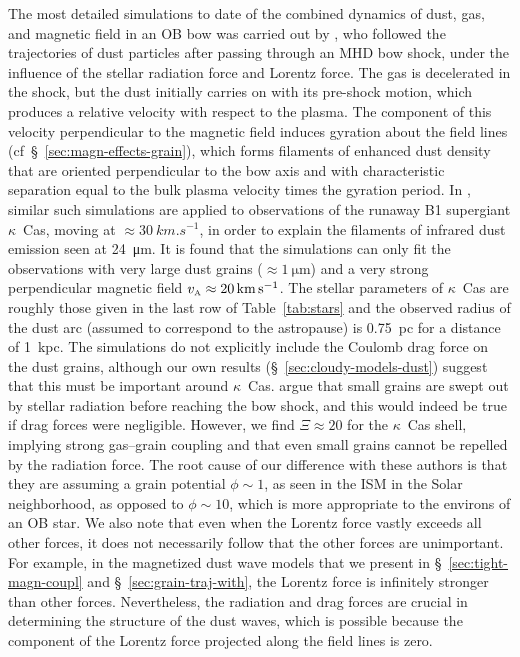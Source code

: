 The most detailed simulations to date of the combined dynamics of
dust, gas, and magnetic field in an OB bow was carried out by
\citet{Katushkina:2017a}, who followed the trajectories of dust
particles after passing through an MHD bow shock, under the influence
of the stellar radiation force and Lorentz force.  The gas is
decelerated in the shock, but the dust initially carries on with its
pre-shock motion, which produces a relative velocity with respect to
the plasma. The component of this velocity perpendicular to the
magnetic field induces gyration about the field lines
(cf~\S~\ref{sec:magn-effects-grain}), which forms filaments of
enhanced dust density that are oriented perpendicular to the bow axis
and with characteristic separation equal to the bulk plasma velocity
times the gyration period.  In \citet{Katushkina:2018a}, similar such
simulations are applied to observations of the runaway B1 supergiant
\(\kappa\)~Cas, moving at \(\approx \SI{30}{km.s^{-1}}\), in order to explain the
filaments of infrared dust emission seen at \SI{24}{\um}.  It is found
that the simulations can only fit the observations with very large
dust grains (\(\approx \SI{1}{\um}\)) and a very strong perpendicular
magnetic field \(v_{\scriptscriptstyle\text{A}} \approx \SI{20}{km.s^{-1}}\).  The stellar
parameters of \(\kappa\)~Cas are roughly those given in the last row of
Table~\ref{tab:stars} and the observed radius of the dust arc (assumed
to correspond to the astropause) is \SI{0.75}{pc} for a distance of
\SI{1}{kpc}.  The \citeauthor{Katushkina:2018a} simulations do not
explicitly include the Coulomb drag force on the dust grains, although
our own results (\S~\ref{sec:cloudy-models-dust}) suggest that this
must be important around \(\kappa\)~Cas.  \citet{Katushkina:2018a} argue
that small grains are swept out by stellar radiation before reaching
the bow shock, and this would indeed be true if drag forces were
negligible.  However, we find \(\Xi \approx 20\) for the
\(\kappa\)~Cas shell, implying strong gas--grain coupling and that even
small grains cannot be repelled by the radiation force.  The root
cause of our difference with these authors is that they are assuming a
grain potential \(\phi \sim 1\), as seen in the ISM in the Solar
neighborhood, as opposed to \(\phi \sim 10\), which is more appropriate to
the environs of an OB star.  We also note that even when the Lorentz
force vastly exceeds all other forces, it does not necessarily follow
that the other forces are unimportant.  For example, in the
magnetized dust wave models that we present in
\S~\ref{sec:tight-magn-coupl} and \S~\ref{sec:grain-traj-with}, the
Lorentz force is infinitely stronger than other forces.  Nevertheless,
the radiation and drag forces are crucial in determining the structure
of the dust waves, which is possible because the component of the
Lorentz force projected along the field lines is zero.


